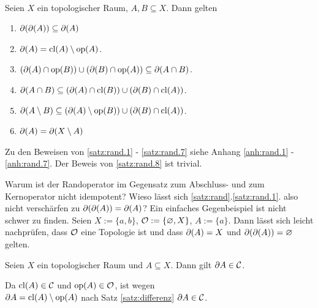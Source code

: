     
    \begin{satz} \label{satz:rand} \ \\
        Seien $X$ ein topologischer Raum, $A, B \subseteq X$. Dann gelten
        \begin{enumerate}
            \item \label{satz:rand.1} $\partial(\partial(A)) \subseteq \partial(A)$
            \item \label{satz:rand.2} $\partial(A) = \text{cl}(A) \setminus \text{op}(A)$.
            \item \label{satz:rand.3} $(\partial(A) \cap \text{op}(B)) \cup (\partial(B) \cap \text{op}(A)) \subseteq \partial(A \cap B)$. 
            \item \label{satz:rand.4} $\partial(A \cap B) \subseteq (\partial(A) \cap \text{cl}(B)) \cup (\partial(B) \cap \text{cl}(A))$.
            \item \label{satz:rand.7} $\partial(A \setminus B) \subseteq (\partial(A) \setminus \text{op}(B)) \cup (\partial(B) \cap \text{cl}(A))$. 
            \item \label{satz:rand.8} $\partial(A) = \partial(X \setminus A)$
        \end{enumerate}	
        
    \end{satz}
    Zu den Beweisen von \ref{satz:rand.1} - \ref{satz:rand.7} siehe Anhang \ref{anh:rand.1} - \ref{anh:rand.7}. Der Beweis von \ref{satz:rand.8} ist trivial.


    \begin{bem} \label{bem:rand}
        Warum ist der Randoperator im Gegensatz zum Abschluss- und zum Kernoperator nicht idempotent? Wieso lässt sich \ref{satz:rand}.\ref{satz:rand.1}. also nicht verschärfen zu $\partial(\partial(A)) = \partial(A)$? Ein einfaches Gegenbeispiel ist nicht schwer zu finden. Seien $X := \{a, b\}$, $\mathcal{O} := \{\varnothing, X\}$, $A := \{a\}$. Dann lässt sich leicht nachprüfen, dass $\mathcal{O}$ eine Topologie ist und dass $\partial(A) = X$ und $\partial(\partial(A)) = \varnothing$ gelten.
    \end{bem}


    \begin{kor}\label{kor:rand-abg}
        Seien $X$ ein topologischer Raum und $A \subseteq X$. Dann gilt $\partial A \in \mathcal{C}$.
    \end{kor}
    \begin{bew}
        Da $\text{cl}(A) \in \mathcal{C}$ und $\text{op}(A) \in \mathcal{O}$, ist wegen \\
        $\partial A = \text{cl}(A) \setminus \text{op}(A)$ nach Satz \ref{satz:differenz} $\partial A \in \mathcal{C}$.
    \end{bew}
    

